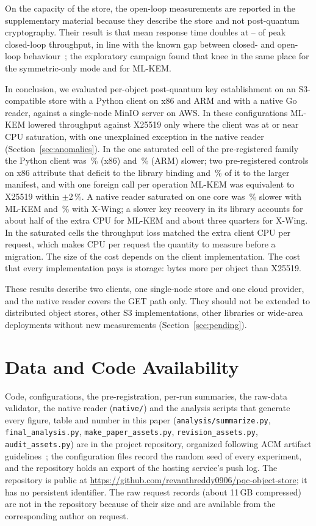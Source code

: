 \documentclass[conference]{IEEEtran}
\begin{document}
On the capacity of the store, the open-loop measurements are reported in the supplementary
material because they describe the store and not post-quantum cryptography. Their result is that
mean response time doubles at \RevQMidRhoKneeLo--\RevQSmallRhoKneeHi{} of peak closed-loop
throughput, in line with the known gap between closed- and open-loop
behaviour~\cite{schroeder2006}; the exploratory campaign found that knee in the same place for
the symmetric-only mode and for ML-KEM.

In conclusion, we evaluated per-object post-quantum key establishment on an S3-compatible store with a Python
client on x86 and ARM and with a native Go reader, against a single-node MinIO server on AWS. In
these configurations ML-KEM lowered throughput against X25519 only where the client was at or
near CPU saturation, with one unexplained exception in the native reader
(Section~\ref{sec:anomalies}). In the one saturated cell of the pre-registered family the
Python client was \RevHotDeficit\,\% (x86) and \ArmHotDeficit\,\% (ARM) slower; two
pre-registered controls on x86 attribute that deficit to the library binding and
\AudPadShare\,\% of it to the larger manifest, and with one foreign call per operation ML-KEM was
equivalent to X25519 within $\pm$2\,\%. A native reader saturated on one core was
\AudNOneMlkemDeficit\,\% slower with ML-KEM and \AudNOneXwingDeficit\,\% with X-Wing; a slower
key recovery in its library accounts for about half of the extra CPU for ML-KEM and about three
quarters for X-Wing. In the saturated cells the throughput loss matched the extra client CPU per
request, which makes CPU per request the quantity to measure before a migration. The size of
the cost depends on the client implementation. The cost that every implementation pays is
storage: \RevMetaIntrinsic{} bytes more per object than X25519.

These results describe two clients, one single-node store and one cloud provider, and the
native reader covers the GET path only. They should not be extended to distributed object
stores, other S3 implementations, other libraries or wide-area deployments without new
measurements (Section~\ref{sec:pending}).

\section*{Data and Code Availability}
Code, configurations, the pre-registration, per-run summaries, the raw-data validator, the
native reader (\texttt{native/}) and the analysis scripts that generate every figure, table and
number in this paper (\texttt{analysis/summarize.py}, \texttt{final\_analysis.py},
\texttt{make\_paper\_assets.py}, \texttt{revision\_assets.py}, \texttt{audit\_assets.py}) are in
the project repository, organized following ACM artifact guidelines~\cite{acmbadges}; the
configuration files record the random seed of every experiment, and the repository holds an
export of the hosting service's push log. The repository is public at
\url{https://github.com/revanthreddy0906/pqc-object-store}; it has no persistent identifier. The raw
request records (about 11\,GB compressed) are not in the repository because of their size and are
available from the corresponding author on request.



\end{document}
